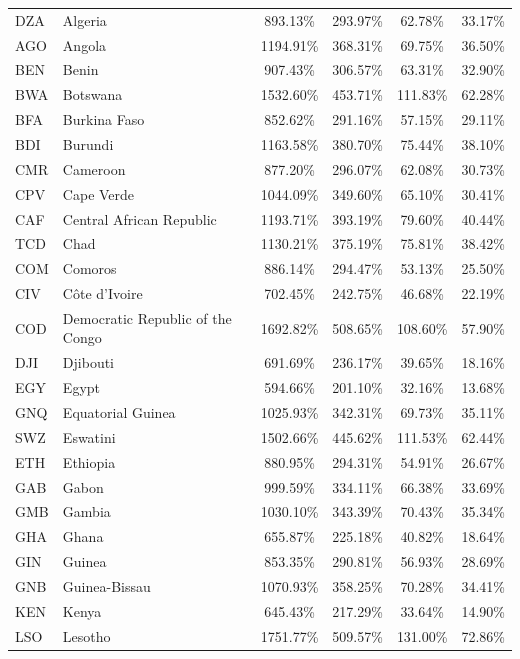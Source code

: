 \begin{center}
\begin{longtable}{llcccc}
  DZA & Algeria & 893.13\% & 293.97\% & 62.78\% & 33.17\% \\ 
  AGO & Angola & 1194.91\% & 368.31\% & 69.75\% & 36.50\% \\ 
  BEN & Benin & 907.43\% & 306.57\% & 63.31\% & 32.90\% \\ 
  BWA & Botswana & 1532.60\% & 453.71\% & 111.83\% & 62.28\% \\ 
  BFA & Burkina Faso & 852.62\% & 291.16\% & 57.15\% & 29.11\% \\ 
  BDI & Burundi & 1163.58\% & 380.70\% & 75.44\% & 38.10\% \\ 
  CMR & Cameroon & 877.20\% & 296.07\% & 62.08\% & 30.73\% \\ 
  CPV & Cape Verde & 1044.09\% & 349.60\% & 65.10\% & 30.41\% \\ 
  CAF & Central African Republic & 1193.71\% & 393.19\% & 79.60\% & 40.44\% \\ 
  TCD & Chad & 1130.21\% & 375.19\% & 75.81\% & 38.42\% \\ 
  COM & Comoros & 886.14\% & 294.47\% & 53.13\% & 25.50\% \\ 
  CIV & Côte d’Ivoire & 702.45\% & 242.75\% & 46.68\% & 22.19\% \\ 
  COD & Democratic Republic of the Congo & 1692.82\% & 508.65\% & 108.60\% & 57.90\% \\ 
  DJI & Djibouti & 691.69\% & 236.17\% & 39.65\% & 18.16\% \\ 
  EGY & Egypt & 594.66\% & 201.10\% & 32.16\% & 13.68\% \\ 
  GNQ & Equatorial Guinea & 1025.93\% & 342.31\% & 69.73\% & 35.11\% \\ 
  SWZ & Eswatini & 1502.66\% & 445.62\% & 111.53\% & 62.44\% \\ 
  ETH & Ethiopia & 880.95\% & 294.31\% & 54.91\% & 26.67\% \\ 
  GAB & Gabon & 999.59\% & 334.11\% & 66.38\% & 33.69\% \\ 
  GMB & Gambia & 1030.10\% & 343.39\% & 70.43\% & 35.34\% \\ 
  GHA & Ghana & 655.87\% & 225.18\% & 40.82\% & 18.64\% \\ 
  GIN & Guinea & 853.35\% & 290.81\% & 56.93\% & 28.69\% \\ 
  GNB & Guinea-Bissau & 1070.93\% & 358.25\% & 70.28\% & 34.41\% \\ 
  KEN & Kenya & 645.43\% & 217.29\% & 33.64\% & 14.90\% \\ 
  LSO & Lesotho & 1751.77\% & 509.57\% & 131.00\% & 72.86\% \\ 

\end{longtable}
\end{center}
